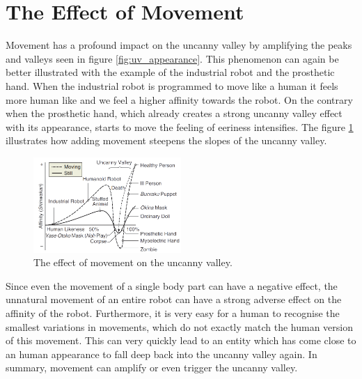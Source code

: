 \section{The Effect of Movement}
Movement has a profound impact on the uncanny valley by amplifying the peaks and valleys seen in figure \ref{fig:uv_appearance}. This phenomenon can again be better illustrated with the example of the industrial robot and the prosthetic hand. When the industrial robot is programmed to move like a human it feels more human like and we feel a higher affinity towards the robot. On the contrary when the prosthetic hand, which already creates a strong uncanny valley effect with its appearance, starts to move the feeling of eeriness intensifies.
The figure \ref{fig:uv_movement} illustrates how adding movement steepens the slopes of the uncanny valley. \cite{original_masahiro}\\
\begin{figure} %
    \centering
    \includegraphics[width=0.5\textwidth]{graphics/uv_movement.png}
    \caption{The effect of movement on the uncanny valley.}
    \label{fig:uv_movement}
\end{figure}
Since even the movement of a single body part can have a negative effect, the unnatural movement of an entire robot can have a strong adverse effect on the affinity of the robot. Furthermore, it is very easy for a human to recognise the smallest variations in movements, which do not exactly match the human version of this movement. This can very quickly lead to an entity which has come close to an human appearance to fall deep back into the uncanny valley again. In summary, movement can amplify or even trigger the uncanny valley. \cite{original_masahiro}
